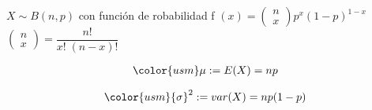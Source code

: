     $X \sim B(n,p)$ con función de robabilidad { \color{usm}f $\left( x \right) =\left( \begin{matrix} n \\ x \end{matrix} \right) { p }^{ x }{ (1-p) }^{ 1-x }$}\\
  
    $\left( \begin{matrix} n \\ x \end{matrix} \right) =\dfrac { n! }{ x! \; (n-x)! }$ \\
    
     \begin{minipage}[b]{\textwidth}
\begin{minipage}[b]{0.5 \textwidth}
 \begin{eqnarray*}
        {\color{usm}\mu} :=E(X)  =  np\\
                                
    \end{eqnarray*}
\end{minipage} \hfill \begin{minipage}[b]{0.5 \textwidth}
\begin{eqnarray*}
        {\color{usm}{ \sigma  }^{ 2 }} := var(X)  =  np(1-p)\\
                                                
    \end{eqnarray*}
\end{minipage}
\end{minipage}
     
